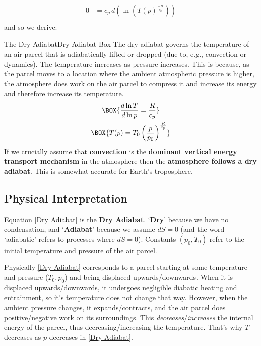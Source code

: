 \begin{align*}
    0 & = c_p\,d\left(\ln \left(T(p)^\frac{-R}{c_p}\right)\right)\\
\end{align*}
and so we derive:
\begin{fact}{The Dry Adiabat}{Dry Adiabat Box}\label{Dry Adiabat Box}
The dry adiabat governs the temperature of an air parcel that is adiabatically lifted or dropped (due to, e.g., convection or dynamics). The temperature increases as pressure increases. This is because, as the parcel moves to a location where the ambient atmospheric pressure is higher, the atmosphere does work on the air parcel to compress it and increase its energy and therefore increase its temperature.
    \begin{gather}
    \label{Dry Adiabat Slope}
    \BOX{
        \frac{d\ln T}{d\ln p}=\frac{R}{c_p}
    }\\
    \label{Dry Adiabat}
    \BOX{
        T(p)=T_0\left(\frac{p}{p_0}\right)^\frac{R}{c_p}
    }
    \end{gather}
If we crucially assume that \textbf{convection} is the \textbf{dominant vertical energy transport mechanism} in the atmosphere then the \textbf{atmosphere follows a dry adiabat}. This is somewhat accurate for Earth's troposphere.
\end{fact}
\subsection{Physical Interpretation}

Equation \ref{Dry Adiabat} is the \textbf{Dry Adiabat}. `\textbf{Dry}' because we have no condensation, and `\textbf{Adiabat}' because we assume $dS=0$ (and the word `adiabatic' refers to processes where $dS=0$). Constants $(p_0,T_0)$ refer to the initial temperature and pressure of the air parcel. 

Physically \ref{Dry Adiabat} corresponds to a parcel starting at some temperature and pressure ($T_0,p_0$) and being displaced upwards/downwards. When it is displaced upwards/downwards, it undergoes negligible diabatic heating and entrainment, so it's temperature does not change that way. However, when the ambient pressure changes, it expands/contracts, and the air parcel does positive/negative work on its surroundings. This \textit{decreases}/\textit{increases} the internal energy of the parcel, thus decreasing/increasing the temperature. That's why $T$ decreases as $p$ decreases in \ref{Dry Adiabat}. 

